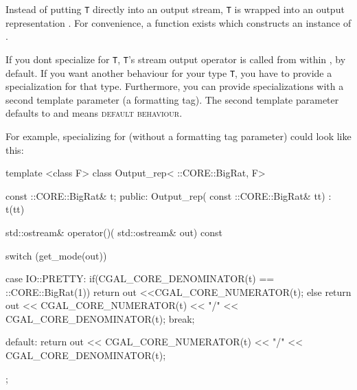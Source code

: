 Instead of putting \texttt{T} directly into an output stream, \texttt{T} is wrapped into an output representation . For convenience, a function  exists which constructs an instance of .

If you dont specialize  for \texttt{T}, \texttt{T}'s stream output operator is called from within , by default. If you want another behaviour for your type \texttt{T}, you have to provide a specialization for that type. Furthermore, you can provide specializations with a second template parameter (a formatting tag). The second template parameter defaults to  and means \textsc{default behaviour}.

For example, specializing  for  (without a formatting tag parameter) could look like this:

\ccExample
\begin{ccExampleCode}
template <class F>
class Output_rep< ::CORE::BigRat, F> {
    const ::CORE::BigRat& t;
public:
    Output_rep( const ::CORE::BigRat& tt) : t(tt) {}

    std::ostream& operator()( std::ostream& out) const {
        switch (get_mode(out)) {
        case IO::PRETTY:{
            if(CGAL_CORE_DENOMINATOR(t) == ::CORE::BigRat(1))
                return out <<CGAL_CORE_NUMERATOR(t);
            else
                return out << CGAL_CORE_NUMERATOR(t)
                           << "/"
                           << CGAL_CORE_DENOMINATOR(t);
            break;
        }

        default:
            return out << CGAL_CORE_NUMERATOR(t)
                       << "/"
                       << CGAL_CORE_DENOMINATOR(t);
        }
    }
};
\end{ccExampleCode}
